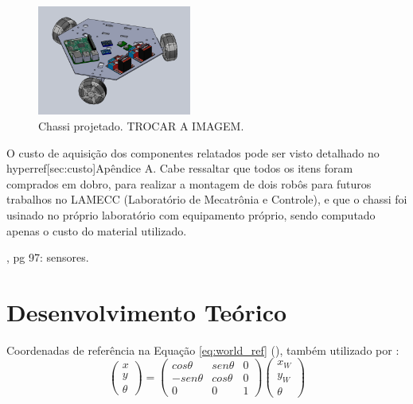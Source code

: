 \begin{figure}[h]
  \centering
  \includegraphics[width = 0.45\textwidth]{imagens/proto01}
  \caption{Chassi projetado. TROCAR A IMAGEM.}
  \label{fig:chassi}
\end{figure}

O custo de aquisição dos componentes relatados pode ser visto detalhado no hyperref[sec:custo]{Apêndice A}. Cabe ressaltar que todos os itens foram comprados em dobro, para realizar a montagem de dois robôs para futuros trabalhos no LAMECC (Laboratório de Mecatrônia e Controle), e que o chassi foi usinado no próprio laboratório com equipamento próprio, sendo computado apenas o custo do material utilizado.


\cite{siegwart2011introduction}, pg 97: sensores.

\section{Desenvolvimento Teórico}
\label{sec:teorico}


Coordenadas de referência na Equação \ref{eq:world_ref} (\cite{siegwart2011introduction}), também utilizado por \cite{ritter2016modelagem}:
\begin{equation}
  \begin{pmatrix}
    x \\
    y \\
    \theta
  \end{pmatrix}
  =
  \begin{pmatrix}
    cos \theta & sen \theta & 0 \\
    -sen\theta & cos \theta & 0 \\
    0          & 0          & 1
  \end{pmatrix}
  \begin{pmatrix}
    x_W \\
    y_W \\
    \theta
  \end{pmatrix}
  \label{eq:world_ref}
\end{equation}


